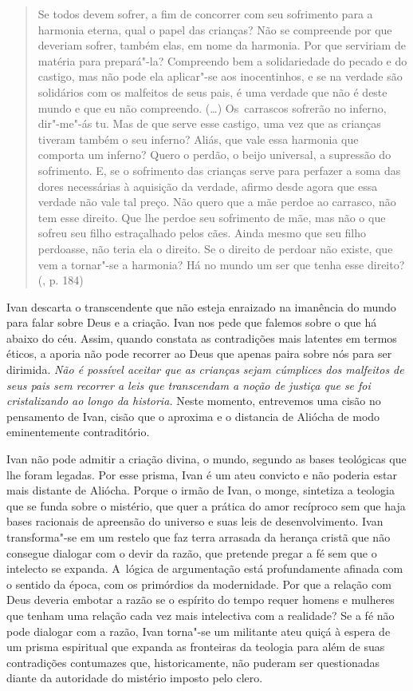 \begin{quote}
Se todos devem sofrer, a fim de concorrer com seu sofrimento para a
harmonia eterna, qual o papel das crianças? Não se compreende por que
deveriam sofrer, também elas, em nome da harmonia. Por que serviriam de
matéria para prepará"-la? Compreendo bem a solidariedade do pecado e do
castigo, mas não pode ela aplicar"-se aos inocentinhos, e se na verdade
são solidários com os malfeitos de seus pais, é uma verdade que não é
deste mundo e que eu não compreendo. (\ldots) Os~carrascos sofrerão no
inferno, dir"-me"-ás tu. Mas de que serve esse castigo, uma vez que as
crianças tiveram também o seu inferno? Aliás, que vale essa harmonia que
comporta um inferno? Quero o perdão, o beijo universal, a supressão do
sofrimento. E, se o sofrimento das crianças serve para perfazer a soma
das dores necessárias à aquisição da verdade, afirmo desde agora que
essa verdade não vale tal preço. Não quero que a mãe perdoe ao carrasco,
não tem esse direito. Que lhe perdoe seu sofrimento de mãe, mas não o
que sofreu seu filho estraçalhado pelos cães. Ainda mesmo que seu filho
perdoasse, não teria ela o direito. Se o direito de perdoar não existe,
que vem a tornar"-se a harmonia? Há no mundo um ser que tenha esse
direito? (, p. 184)
\end{quote}

Ivan descarta o transcendente que não esteja enraizado na imanência do
mundo para falar sobre Deus e a criação. Ivan nos pede que falemos sobre
o que há abaixo do céu. Assim, quando constata as contradições mais
latentes em termos éticos, a aporia não pode recorrer ao Deus que apenas
paira sobre nós para ser dirimida. \emph{Não é possível aceitar que as
crianças sejam cúmplices dos malfeitos de seus pais sem recorrer a leis
que transcendam a noção de justiça que se foi cristalizando ao longo da
historia.} Neste momento, entrevemos uma cisão no pensamento de Ivan,
cisão que o aproxima e o distancia de Aliócha de modo eminentemente
contraditório.

Ivan não pode admitir a criação divina, o mundo, segundo as bases
teológicas que lhe foram legadas. Por esse prisma, Ivan é um ateu
convicto e não poderia estar mais distante de Aliócha. Porque o irmão de
Ivan, o monge, sintetiza a teologia que se funda sobre o mistério, que
quer a prática do amor recíproco sem que haja bases racionais de
apreensão do universo e suas leis de desenvolvimento. Ivan transforma"-se
em um restelo que faz terra arrasada da herança cristã que não consegue
dialogar com o devir da razão, que pretende pregar a fé sem que o
intelecto se expanda. A~lógica de argumentação está profundamente
afinada com o sentido da época, com os primórdios da modernidade. Por
que a relação com Deus deveria embotar a razão se o espírito do tempo
requer homens e mulheres que tenham uma relação cada vez mais
intelectiva com a realidade? Se a fé não pode dialogar com a razão, Ivan
torna"-se um militante ateu quiçá à espera de um prisma espiritual que
expanda as fronteiras da teologia para além de suas contradições
contumazes que, historicamente, não puderam ser questionadas diante da
autoridade do mistério imposto pelo clero.

